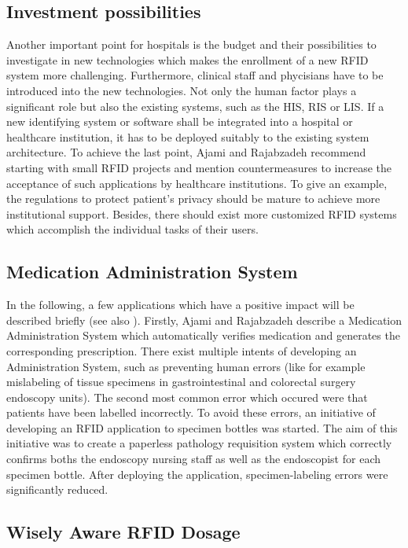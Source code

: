 \subsection{Investment possibilities}

Another important point for hospitals is the budget and their possibilities to investigate in new technologies which makes the enrollment of a new RFID system more challenging. Furthermore, clinical staff and phycisians have to be introduced into the new technologies. Not only the human factor plays a significant role but also the existing systems, such as the \ac{HIS}, \ac{RIS} or \ac{LIS}. If a new identifying system or software shall be integrated into a hospital or healthcare institution, it has to be deployed suitably to the existing system architecture. To achieve the last point, Ajami and Rajabzadeh \cite{ncbi} recommend starting with small RFID projects and mention countermeasures to increase the acceptance of such applications by healthcare institutions. To give an example, the regulations to protect patient's privacy should be mature to achieve more institutional support. Besides, there should exist more customized RFID systems which accomplish the individual tasks of their users.  

\subsection{Medication Administration System}

In the following, a few applications which have a positive impact will be described briefly (see also \cite{ncbi}). Firstly, Ajami and Rajabzadeh describe a Medication Administration System which automatically verifies medication and generates the corresponding prescription. There exist multiple intents of developing an Administration System, such as preventing human errors (like for example mislabeling of tissue specimens in gastrointestinal and colorectal surgery endoscopy units). The second most common error which occured were that patients have been labelled incorrectly. To avoid these errors, an initiative of developing an RFID application to specimen bottles was started. The aim of this initiative was to create a paperless pathology requisition system which correctly confirms boths the endoscopy nursing staff as well as the endoscopist for each specimen bottle. After deploying the application, specimen-labeling errors were significantly reduced.

\subsection{Wisely Aware RFID Dosage}

